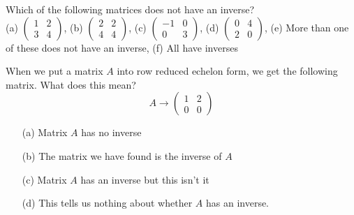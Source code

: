 \begin{problem}
    Which of the following matrices does not have an inverse?\\
        (a) $\begin{pmatrix} 1 & 2 \\ 3 & 4 \end{pmatrix}$, \quad (b)
        $\begin{pmatrix} 2 & 2 \\ 4 & 4 \end{pmatrix}$, \quad (c)
        $\begin{pmatrix} -1 & 0 \\ 0 & 3 \end{pmatrix}$, \quad (d)
        $\begin{pmatrix} 0 & 4 \\ 2 & 0 \end{pmatrix}$, \quad (e)
        More than one of these does not have an inverse, \quad (f)
        All have inverses
\end{problem}

%             

\begin{problem}
    When we put a matrix $A$ into row reduced echelon form, we get the following matrix.
    What does this mean?
    \[ A \to \begin{pmatrix} 1 & 2 \\ 0 & 0 \end{pmatrix} \]
    \begin{enumerate}
        \item[(a)] Matrix $A$ has no inverse
        \item[(b)] The matrix we have found is the inverse of $A$
        \item[(c)] Matrix $A$ has an inverse but this isn't it
        \item[(d)] This tells us nothing about whether $A$ has an inverse.
    \end{enumerate}
\end{problem}

%             


